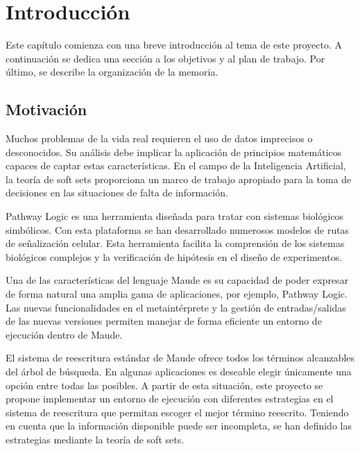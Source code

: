 
\chapter{Introducción}
\label{cap:introduccion}


Este capítulo comienza con una breve introducción al tema de este proyecto. A continuación se dedica una sección a los objetivos y al plan de trabajo. Por último, se describe la organización de la memoria.


\section{Motivación}

Muchos problemas de la vida real requieren el uso de datos imprecisos o desconocidos. Su análisis debe implicar la aplicación de principios matemáticos capaces de captar estas características. 
En el campo de la Inteligencia Artificial, la teoría de soft sets proporciona un marco de trabajo apropiado para la toma de decisiones en las situaciones de falta de información.

Pathway Logic es una herramienta diseñada para tratar con sistemas biológicos simbólicos.
Con esta plataforma se han desarrollado numerosos modelos de rutas de señalización celular.
Esta herramienta facilita la comprensión de los sistemas biológicos complejos y la verificación de hipótesis en el diseño de experimentos.

Una de las características del lenguaje Maude es su capacidad de poder expresar de forma natural una amplia gama de aplicaciones, por ejemplo, Pathway Logic.
Las nuevas funcionalidades en el metaintérprete y la gestión de entradas/salidas de las nuevas versiones permiten manejar de forma eficiente un entorno de ejecución dentro de Maude.

El sistema de reescritura estándar de Maude ofrece todos los términos alcanzables del árbol de búsqueda. 
En algunas aplicaciones es deseable elegir únicamente una opción entre todas las posibles.
A partir de esta situación, este proyecto se propone implementar un entorno de ejecución con diferentes estrategias en el sistema de reescritura que permitan escoger el mejor término reescrito.
Teniendo en cuenta que la información disponible puede ser incompleta, se han definido las estrategias mediante la teoría de soft sets.

